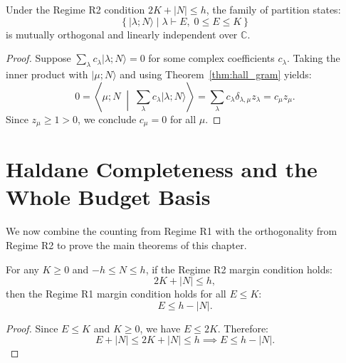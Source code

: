 \begin{corollary}
\label{cor:partition_linear_independence}
Under the Regime R2 condition $2K + |N| \le h$, the family of partition states:
\begin{equation}
\left\{ |\lambda; N\rangle \mid \lambda \vdash E,\; 0 \le E \le K \right\}
\end{equation}
is mutually orthogonal and linearly independent over $\mathbb{C}$.
\end{corollary}

\begin{proof}
Suppose $\sum_{\lambda} c_\lambda |\lambda; N\rangle = 0$ for some complex coefficients $c_\lambda$.
Taking the inner product with $|\mu; N\rangle$ and using Theorem~\ref{thm:hall_gram} yields:
\begin{equation}
0 = \left\langle \mu; N \;\middle|\; \sum_\lambda c_\lambda |\lambda; N\rangle \right\rangle = \sum_\lambda c_\lambda \delta_{\lambda, \mu} z_\lambda = c_\mu z_\mu.
\end{equation}
Since $z_\mu \ge 1 > 0$, we conclude $c_\mu = 0$ for all $\mu$.
\end{proof}

\section{Haldane Completeness and the Whole Budget Basis}

We now combine the counting from Regime R1 with the orthogonality from Regime R2 to prove the main theorems of this chapter.

\begin{lemma}[R2 Implies R1]
\label{lem:r2_implies_r1}
For any $K \ge 0$ and $-h \le N \le h$, if the Regime R2 margin condition holds:
\begin{equation}
2K + |N| \le h,
\end{equation}
then the Regime R1 margin condition holds for all $E \le K$:
\begin{equation}
E \le h - |N|.
\end{equation}
\end{lemma}

\begin{proof}
Since $E \le K$ and $K \ge 0$, we have $E \le 2K$. Therefore:
\begin{equation}
E + |N| \le 2K + |N| \le h \implies E \le h - |N|.
\end{equation}
\end{proof}

